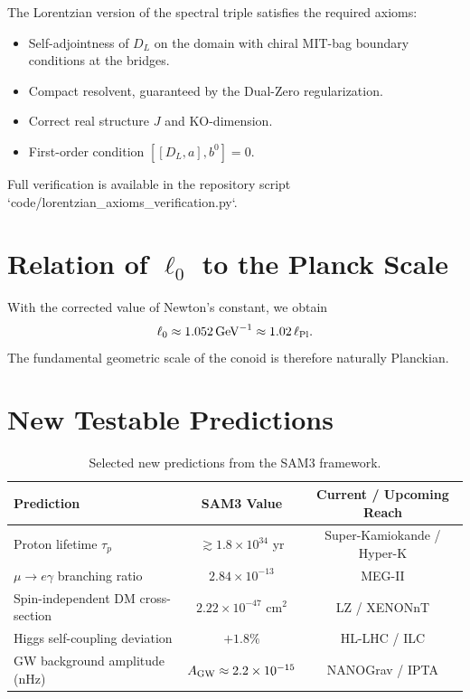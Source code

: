 \documentclass[11pt,a4paper]{article}
\begin{document}
The Lorentzian version of the spectral triple satisfies the required axioms:

\begin{itemize}
    \item Self-adjointness of \(D_L\) on the domain with chiral MIT-bag boundary conditions at the bridges.
    \item Compact resolvent, guaranteed by the Dual-Zero regularization.
    \item Correct real structure \(J\) and KO-dimension.
    \item First-order condition \([[D_L, a], b^0] = 0\).
\end{itemize}

Full verification is available in the repository script `code/lorentzian_axioms_verification.py`.

\section{Relation of \(\ell_0\) to the Planck Scale}

With the corrected value of Newton’s constant, we obtain
\[
\ell_0 \approx 1.052\,\text{GeV}^{-1} \approx 1.02\,\ell_{\rm Pl}.
\]
The fundamental geometric scale of the conoid is therefore naturally Planckian.

\section{New Testable Predictions}

\begin{table}[ht]
\centering
\begin{tabular}{lcc}
\toprule
Prediction & SAM3 Value & Current / Upcoming Reach \\
\midrule
Proton lifetime \(\tau_p\) & \(\gtrsim 1.8 \times 10^{34}\) yr & Super-Kamiokande / Hyper-K \\
\(\mu \to e\gamma\) branching ratio & \(2.84 \times 10^{-13}\) & MEG-II \\
Spin-independent DM cross-section & \(2.22 \times 10^{-47}\) cm\(^2\) & LZ / XENONnT \\
Higgs self-coupling deviation & \(+1.8\%\) & HL-LHC / ILC \\
GW background amplitude (nHz) & \(A_{\rm GW} \approx 2.2 \times 10^{-15}\) & NANOGrav / IPTA \\
\bottomrule
\end{tabular}
\caption{Selected new predictions from the SAM3 framework.}
\end{table}
\end{document}
